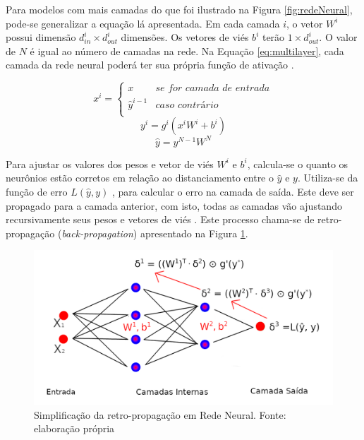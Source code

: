 Para modelos com mais camadas do que foi ilustrado na Figura \ref{fig:redeNeural}, pode-se generalizar a equação lá apresentada. Em cada camada $i$, o vetor $W^{i}$ possui dimensão $d^{i}_{in} \times d^{i}_{out}$ dimensões. Os vetores de viés $b^{i}$ terão $1 \times d^{i}_{out}$. O valor de $N$ é igual ao número de camadas na rede. Na Equação \ref{eq:multilayer}, cada camada da rede neural poderá ter sua própria função de ativação \cite{GOLDBERG2017}. 

\begin{displaymath}
    x^{i} = 
    \begin{cases}
      x & \textit{se for camada de entrada} \\
      \hat{y}^{i-1} & \textit{caso contrário} \\
    \end{cases}       
\end{displaymath}
\begin{equation}
	\label{eq:multilayer}
    y^{i} = g^{i}(x^{i}W^{i} + b^{i})
\end{equation}
\begin{displaymath}
    \hat{y} = y^{N-1}W^{N}
\end{displaymath}

Para ajustar os valores dos pesos e vetor de viés $W^{i}$ e $b^{i}$, calcula-se o quanto os neurônios estão corretos em relação ao distanciamento entre o $\hat{y}$ e $y$. Utiliza-se da função de erro $L(\hat{y}, y)$ \cite{GOLDBERG2017}, para calcular o erro na camada de saída. Este deve ser propagado para a camada anterior, com isto, todas as camadas vão ajustando recursivamente seus pesos e vetores de viés \cite{NIELSEN2015}. Este processo chama-se de retro-propagação (\textit{back-propagation}) apresentado na Figura \ref{fig:redeNeuralBackprop}.

\begin{figure}[h]
	\centering
    \includegraphics[keepaspectratio=true,scale=1.3]{figuras/redeNeuralBackprop}
	\caption[Retro-propagação em Rede Neural]{Simplificação da retro-propagação em Rede Neural. Fonte: elaboração própria}
	\label{fig:redeNeuralBackprop}
\end{figure}

